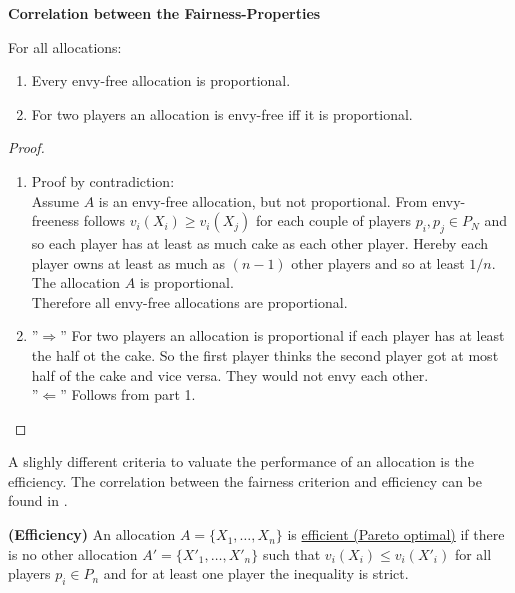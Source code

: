%
\textbf{Correlation between the Fairness-Properties}
\begin{lem}
For all allocations:
\begin{enumerate}
\item Every envy-free allocation is proportional.
\item For two players an allocation is envy-free iff it is proportional.
\end{enumerate}
\end{lem}
\begin{proof}
\begin{enumerate}
\item Proof by contradiction:\\ Assume $A$ is an envy-free allocation, but not proportional. From envy-freeness follows $v_i(X_i) \geq v_i(X_j)$ for each couple of players $p_i, p_j \in P_N$ and so each player has at least as much cake as each other player. Hereby each player owns at least as much as $(n-1)$ other players and so at least $1/n$. The allocation $A$ is proportional. %
\\Therefore all envy-free allocations are proportional.
\item ''$\Rightarrow$'' For two players an allocation is proportional if each player has at least the half ot the cake. So the first player thinks the second player got at most half of the cake and vice versa. They would not envy each other.\\ ''$\Leftarrow$'' Follows from part 1.\\
\end{enumerate}
\end{proof}
A slighly different criteria to valuate the performance of an allocation is the efficiency. The correlation between the fairness criterion and efficiency can be found in \cite{eff}. 
\begin{defi}{\textbf{(Efficiency)}}
\newline An allocation $A=\{X_1,\dots, X_n\}$ is \underline{efficient (Pareto optimal)} if there is no other allocation $A'=\{X'_1,\dots, X'_n\}$ such that $v_i(X_i)\leq v_i(X'_i)$ for all players $p_i \in P_n$ and for at least one player the inequality is strict.
\end{defi}
 
